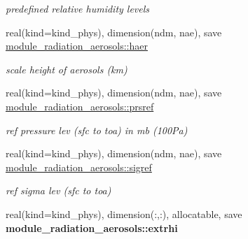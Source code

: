 \begin{DoxyCompactItemize}
\begin{DoxyCompactList}\small\item\em predefined relative humidity levels \end{DoxyCompactList}\item 
\mbox{\label{group__module__radiation__aerosols_ga8ce24a58afb33dd372995bf5aaf95be9}} 
real(kind=kind\+\_\+phys), dimension(ndm, nae), save \hyperlink{group__module__radiation__aerosols_ga8ce24a58afb33dd372995bf5aaf95be9}{module\+\_\+radiation\+\_\+aerosols\+::haer}
\begin{DoxyCompactList}\small\item\em scale height of aerosols (km) \end{DoxyCompactList}\item 
\mbox{\label{group__module__radiation__aerosols_ga274fad1b6e00e66375882e32494d61c0}} 
real(kind=kind\+\_\+phys), dimension(ndm, nae), save \hyperlink{group__module__radiation__aerosols_ga274fad1b6e00e66375882e32494d61c0}{module\+\_\+radiation\+\_\+aerosols\+::prsref}
\begin{DoxyCompactList}\small\item\em ref pressure lev (sfc to toa) in mb (100\+Pa) \end{DoxyCompactList}\item 
\mbox{\label{group__module__radiation__aerosols_ga227ac7558dc0f33c34c34544771617ec}} 
real(kind=kind\+\_\+phys), dimension(ndm, nae), save \hyperlink{group__module__radiation__aerosols_ga227ac7558dc0f33c34c34544771617ec}{module\+\_\+radiation\+\_\+aerosols\+::sigref}
\begin{DoxyCompactList}\small\item\em ref sigma lev (sfc to toa) \end{DoxyCompactList}\item 
\mbox{\label{group__module__radiation__aerosols_ga40447f925f01790155c4d98ff8b0c04d}} 
real(kind=kind\+\_\+phys), dimension(\+:,\+:), allocatable, save {\bfseries module\+\_\+radiation\+\_\+aerosols\+::extrhi}
\item 
\mbox{\label{group__module__radiation__aerosols_ga439929b1de549fadecc8537bae13e9de}} 

\end{DoxyCompactItemize}
